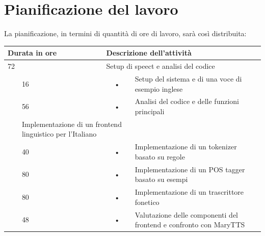 \documentclass[11pt,notitlepage]{article}
\begin{document}
\bigskip
\section*{Pianificazione del lavoro}
La pianificazione, in termini di quantità di ore di lavoro, sarà così distribuita:

\begin{center}
	
\begin{tabular}{|l|l|c l|}
	\hline
	\multicolumn{2}{|l|}{\textbf{Durata in ore}}		&	\multicolumn{2}{l|}{\textbf{Descrizione dell'attività}}\\
	\hline
	\multicolumn{2}{|l|}{72}	&	\multicolumn{2}{l|}{Setup di speect e analisi del codice}\\
	\hline
	\multirow{3}{1cm}{ }    &            16            &            \hspace{5mm}•\hspace{2mm}            & Setup del sistema e di una voce di esempio inglese \\
	\cline{2-2}
	&            56            &            \hspace{5mm}•\hspace{2mm}            &            Analisi del codice e delle funzioni principali\\
	\hline
	
	\multicolumn{2}{|l|}{248}	&	\multicolumn{2}{l|}{Implementazione di un frontend linguistico per l'Italiano}\\
	\hline

	\multirow{3}{1cm}{ }    &            40            &            \hspace{5mm}•\hspace{2mm}            & Implementazione di un tokenizer basato su regole \\
	\cline{2-2}
	&            80            &            \hspace{5mm}•\hspace{2mm}            &            Implementazione di un POS tagger basato su esempi \\
	\cline{2-2}
	&            80            &            \hspace{5mm}•\hspace{2mm}            &            Implementazione di un trascrittore fonetico \\
	\cline{2-2}
	&            48            &            \hspace{5mm}•\hspace{2mm}            &            Valutazione delle componenti del frontend e confronto con MaryTTS  \\
	\hline
\end{tabular}

\end{center}
\end{document}
